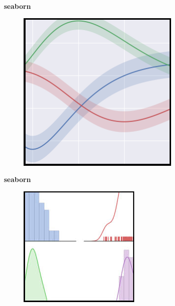 \documentclass[MASTER.tex]{subfiles}
\begin{document}
\begin{frame}
	\Large
	\textbf{seaborn}
	
	\begin{figure}
		\centering
		\includegraphics[width=0.80\linewidth]{seaborn1}
		
	\end{figure}
\end{frame}

\begin{frame}
		\Large
		\textbf{seaborn}
		
	\begin{figure}
		\centering
		\includegraphics[width=0.80\linewidth]{seaborn2}
	\end{figure}
\end{frame}
\end{document}
